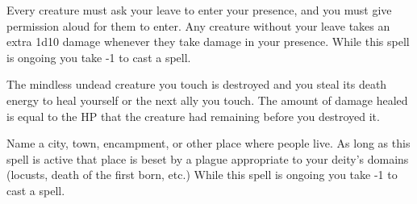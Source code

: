 

Every creature must ask your leave to enter your presence, and you must give permission aloud for them to enter. Any creature without your leave takes an extra 1d10 damage whenever they take damage in your presence. While this spell is ongoing you take -1 to cast a spell.



The mindless undead creature you touch is destroyed and you steal its death energy to heal yourself or the next ally you touch. The amount of damage healed is equal to the HP that the creature had remaining before you destroyed it.

\newpage
{}


Name a city, town, encampment, or other place where people live. As long as this spell is active that place is beset by a plague appropriate to your deity's domains (locusts, death of the first born, etc.) While this spell is ongoing you take -1 to cast a spell.

